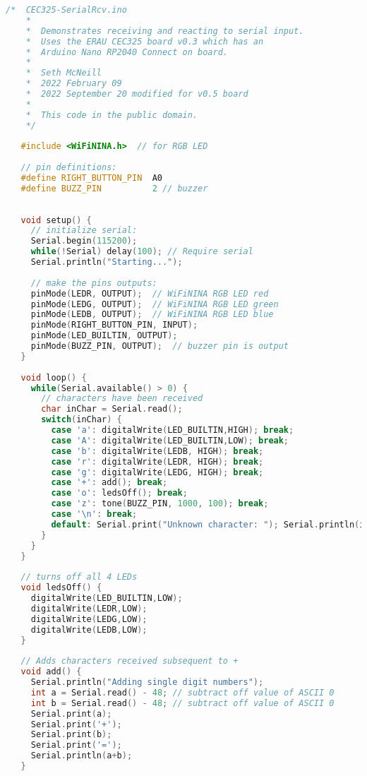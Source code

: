 \begin{lstlisting}[language=C++, caption={This sketch shows controlling parts of the 
    board using input from the serial port. Remember, don't copy and paste from a PDF
    since that process garbles some of the characters.},label={lst:serialreceiveexample}]
    /*  CEC325-SerialRcv.ino
    *  
    *  Demonstrates receiving and reacting to serial input.
    *  Uses the ERAU CEC325 board v0.3 which has an 
    *  Arduino Nano RP2040 Connect on board.
    *  
    *  Seth McNeill
    *  2022 February 09
    *  2022 September 20 modified for v0.5 board
    *  
    *  This code in the public domain.
    */
   
   #include <WiFiNINA.h>  // for RGB LED
   
   // pin definitions:
   #define RIGHT_BUTTON_PIN  A0 
   #define BUZZ_PIN          2 // buzzer
   
   
   void setup() {
     // initialize serial:
     Serial.begin(115200);
     while(!Serial) delay(100); // Require serial
     Serial.println("Starting...");
     
     // make the pins outputs:
     pinMode(LEDR, OUTPUT);  // WiFiNINA RGB LED red
     pinMode(LEDG, OUTPUT);  // WiFiNINA RGB LED green
     pinMode(LEDB, OUTPUT);  // WiFiNINA RGB LED blue
     pinMode(RIGHT_BUTTON_PIN, INPUT);  
     pinMode(LED_BUILTIN, OUTPUT);
     pinMode(BUZZ_PIN, OUTPUT);  // buzzer pin is output
   }
   
   void loop() {
     while(Serial.available() > 0) {  
       // characters have been received
       char inChar = Serial.read();
       switch(inChar) {
         case 'a': digitalWrite(LED_BUILTIN,HIGH); break;
         case 'A': digitalWrite(LED_BUILTIN,LOW); break;
         case 'b': digitalWrite(LEDB, HIGH); break;
         case 'r': digitalWrite(LEDR, HIGH); break;
         case 'g': digitalWrite(LEDG, HIGH); break;
         case '+': add(); break;
         case 'o': ledsOff(); break;
         case 'z': tone(BUZZ_PIN, 1000, 100); break;
         case '\n': break;
         default: Serial.print("Unknown character: "); Serial.println(inChar);
       }
     }
   }
   
   // turns off all 4 LEDs
   void ledsOff() {
     digitalWrite(LED_BUILTIN,LOW);
     digitalWrite(LEDR,LOW);
     digitalWrite(LEDG,LOW);
     digitalWrite(LEDB,LOW);
   }
   
   // Adds characters received subsequent to +
   void add() {
     Serial.println("Adding single digit numbers");
     int a = Serial.read() - 48; // subtract off value of ASCII 0
     int b = Serial.read() - 48; // subtract off value of ASCII 0
     Serial.print(a);
     Serial.print('+');
     Serial.print(b);
     Serial.print('=');
     Serial.println(a+b);
   }   
\end{lstlisting}


